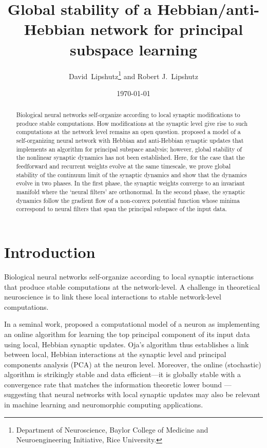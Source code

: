 \documentclass[11pt]{article}
\title{Global stability of a Hebbian/anti-Hebbian network for principal subspace learning}
\author{David~Lipshutz\thanks{Department of Neuroscience, Baylor College of Medicine and Neuroengineering Initiative, Rice University.}\; and Robert J.~Lipshutz}
\date{\today}
\theoremstyle{definition}
\begin{document}
\maketitle

\begin{abstract}
Biological neural networks self-organize according to local synaptic modifications to produce stable computations. 
How modifications at the synaptic level give rise to such computations at the network level remains an open question.
\citet{pehlevan2015hebbian} proposed a model of a self-organizing neural network with Hebbian and anti-Hebbian synaptic updates that implements an algorithm for principal subspace analysis; however, global stability of the nonlinear synaptic dynamics has not been established.
Here, for the case that the feedforward and recurrent weights evolve at the same timescale, we prove global stability of the continuum limit of the synaptic dynamics and show that the dynamics evolve in two phases. 
In the first phase, the synaptic weights converge to an invariant manifold where the `neural filters' are orthonormal. 
In the second phase, the synaptic dynamics follow the gradient flow of a non-convex potential function whose minima correspond to neural filters that span the principal subspace of the input data.
\end{abstract}

\section{Introduction}

Biological neural networks self-organize according to local synaptic interactions that produce stable computations at the network-level. 
A challenge in theoretical neuroscience is to link these local interactions to stable network-level computations.

In a seminal work, \citet{oja1982simplified} proposed a computational model of a neuron as implementing an online algorithm for learning the top principal component of its input data using local, Hebbian synaptic updates.
Oja's algorithm thus establishes a link between local, Hebbian interactions at the synaptic level and principal components analysis (PCA) at the neuron level.
Moreover, the online (stochastic) algorithm is strikingly stable and data efficient---it is globally stable with a convergence rate that matches the information theoretic lower bound \citep{chou2020ode}---suggesting that neural networks with local synaptic updates may also be relevant in machine learning and neuromorphic computing applications.
\end{document}
